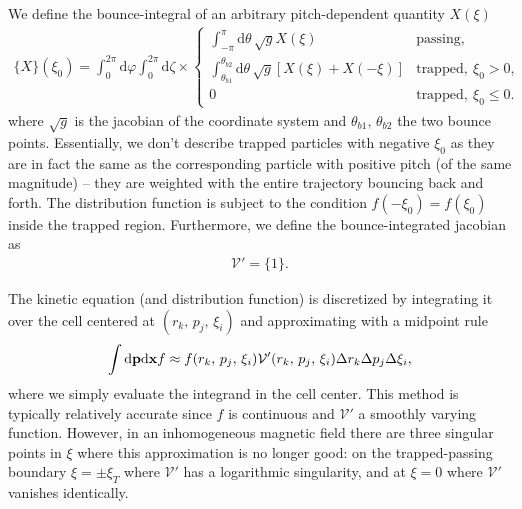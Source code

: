 \documentclass[11pt,a4paper]{article}
\newcommand{\rd}{\ensuremath{\mathrm{d}}}
\renewcommand{\b}[1]{\ensuremath{ {\bf #1 } }}
\begin{document}
\newpage 

We define the bounce-integral of an arbitrary pitch-dependent quantity $X(\xi)$ 
\begin{align}
\{ X \}(\xi_0) = \int_0^{2\pi} \rd \varphi \int_0^{2\pi}\rd \zeta \times \begin{cases}
\int_{-\pi}^\pi \rd \theta \, \sqrt{g}X(\xi) & \text{passing}, \\
\int_{\theta_{b1}}^{\theta_{b2}} \rd \theta \, \sqrt{g}[X(\xi) + X(-\xi)]  & \text{trapped}, ~ \xi_0>0, \\
0 & \text{trapped}, ~ \xi_0\leq 0.
\end{cases}
\end{align}
where $\sqrt{g}$ is the jacobian of the coordinate system and $\theta_{b1},\,\theta_{b2}$ the two bounce points. Essentially, we don't describe trapped particles with negative $\xi_0$ as they are in fact the same as the corresponding particle with positive pitch (of the same magnitude) -- they are weighted with the entire trajectory bouncing back and forth. The distribution function is subject to the condition $f(-\xi_0) = f(\xi_0)$ inside the trapped region.
Furthermore, we define the bounce-integrated jacobian as
\begin{align}
\mathcal{V}' = \{1\}.
\end{align}

The kinetic equation (and distribution function) is discretized by integrating it over the cell centered at $(r_k,\,p_j,\,\xi_i)$ and approximating with a midpoint rule
\begin{align}
\int \rd \b{p} \rd \b{x}  f \approx f(r_k,\,p_j,\,\xi_i) \mathcal{V}'(r_k,\,p_j,\,\xi_i) \Delta r_k \Delta p_j \Delta \xi_i,
\end{align}
where we simply evaluate the integrand in the cell center.
This method is typically relatively accurate since $f$ is continuous and $\mathcal{V}'$ a smoothly varying function. However, in an inhomogeneous magnetic field there are three singular points in $\xi$ where this approximation is no longer good: on the trapped-passing boundary $\xi=\pm \xi_T$ where $\mathcal{V}'$ has a logarithmic singularity, and at $\xi=0$ where $\mathcal{V}'$ vanishes identically.
\end{document}

